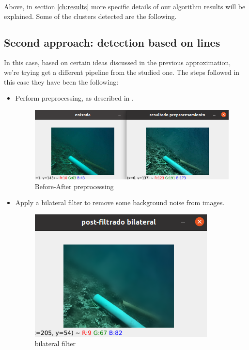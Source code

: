 \documentclass[12pt, a4paper]{article}
\begin{document}
Above, in section \ref{ch:results} more specific details of our algorithm results will be explained. Some of the clusters 
detected are the following. 


\subsection{Second approach: detection based on lines}\label{ch:second_approach}



In this case, based on certain ideas discussed in the previous approximation,
we're trying get a different pipeline from the studied one.  The steps followed
in this case they have been the following:

\begin{itemize}
    
    \item Perform preprocessing, as described in .
    
    \begin{figure}[H]
        \centering
        \includegraphics[scale=0.3]{images_doc/preprocess.png}
        \caption{Before-After preprocessing}
        \label{fig:pprepre}
    \end{figure}

    \item Apply a bilateral filter to remove some background noise from images.
    
    \begin{figure}[H]
        \centering
        \includegraphics[scale=0.3]{images_doc/filtradobilat.png}
        \caption{bilateral filter}
        \label{fig:bilat}
    \end{figure}


\end{itemize}
\end{document}
